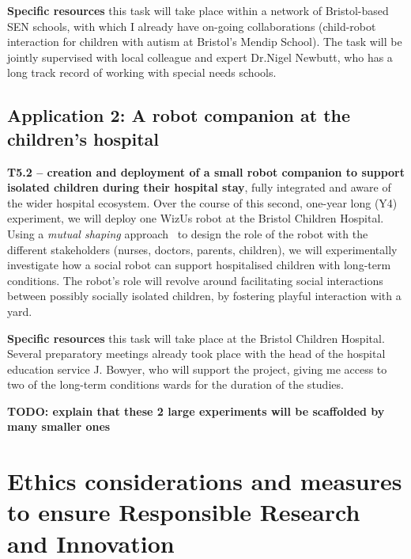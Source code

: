 \documentclass[11pt,a4paper]{report}
\newcommand{\project}{WizUs\xspace}
\newcommand{\TODO}[1]{{\color{red}\textbf{TODO: #1}}}
\begin{document}
\textbf{Specific resources} this task will take place within a network of
Bristol-based SEN schools, with which I already have on-going collaborations
(child-robot interaction for children with autism at Bristol's Mendip School).
The task will be jointly supervised with local colleague and expert Dr.Nigel Newbutt,
who has a long track record of working with special needs schools.





\subsection{Application 2: A robot companion at the children's hospital}
\textbf{T5.2 -- creation and deployment of a small robot companion to support
isolated children during their hospital stay}, fully integrated and aware of the
wider hospital ecosystem. Over the course of this second, one-year long (Y4)
experiment, we will deploy one \project robot at the Bristol Children Hospital.
Using a \emph{mutual shaping} approach~\cite{winkle2018social} to design the
role of the robot with the different stakeholders (nurses, doctors, parents,
children), we will experimentally investigate how a social robot can support
hospitalised children with long-term conditions. The robot's role will revolve
around facilitating social interactions between possibly socially isolated
children, by fostering playful interaction with a yard.

\textbf{Specific resources} this task will take place at the Bristol Children
Hospital. Several preparatory meetings already took place with the head of the
hospital education service J. Bowyer, who will support the project, giving me
access to two of the long-term conditions wards for the duration of the studies.



\TODO{explain that these 2 large experiments will be scaffolded by many smaller
ones}


\section{Ethics considerations and measures to ensure Responsible Research and Innovation}
\end{document}
